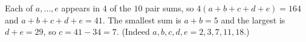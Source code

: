 Each of $a,\dots,e$ appears in $4$ of the $10$ pair sums, so $4(a+b+c+d+e)=164$ and $a+b+c+d+e=41$. The smallest sum is $a+b=5$ and the largest is $d+e=29$, so $c=41-34=\boxed{7}$. (Indeed $a,b,c,d,e=2,3,7,11,18$.)

